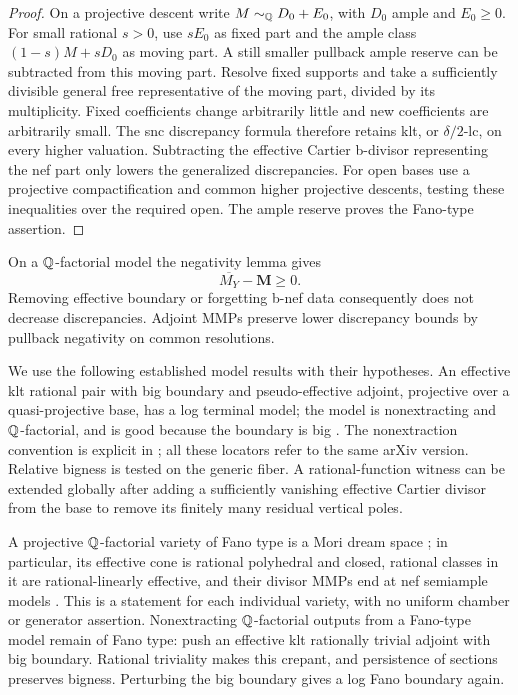 \begin{proof}
On a projective descent write \(M\sim_\mathbb Q D_0+E_0\), with \(D_0\)
ample and \(E_0\ge0\). For small rational \(s>0\), use \(sE_0\) as
fixed part and the ample class \((1-s)M+sD_0\) as moving part.
A still smaller pullback ample reserve can be subtracted from this
moving part. Resolve fixed supports and take a sufficiently divisible
general free representative of the moving part, divided by its
multiplicity. Fixed coefficients change arbitrarily little and new
coefficients are arbitrarily small. The snc discrepancy formula
therefore retains klt, or \(\delta/2\)-lc, on every higher valuation.
Subtracting the effective Cartier b-divisor representing the nef part
only lowers the generalized discrepancies. For open bases use a
projective compactification and common higher projective descents,
testing these inequalities over the required open. The ample reserve
proves the Fano-type assertion.
\end{proof}

On a \(\mathbb Q\)-factorial model the negativity lemma
\cite[Lemma~4.16]{FujinoFundamental} gives
\[
                         \overline{M_Y}-\mathbf M\ge0.
\]
Removing effective boundary or forgetting b-nef data consequently
does not decrease discrepancies. Adjoint MMPs preserve lower
discrepancy bounds by pullback negativity on common resolutions.

We use the following established model results with their hypotheses.
An effective klt rational pair with big boundary and pseudo-effective
adjoint, projective over a quasi-projective base, has a log terminal
model; the model is nonextracting and \(\mathbb Q\)-factorial, and is good
because the boundary is big
\cite[Theorem 1.2 and Lemma 3.9.3]{BCHM}.
The nonextraction convention is explicit in
\cite[Definition~3.6.6]{BCHM}; all these locators refer to the same
arXiv version.
Relative bigness is tested on the generic fiber. A rational-function
witness can be extended globally after adding a sufficiently vanishing
effective Cartier divisor from the base to remove its finitely many
residual vertical poles.

A projective \(\mathbb Q\)-factorial variety of Fano type is a Mori dream
space \cite[Corollary 1.3.1]{BCHM}; in particular, its effective cone
is rational polyhedral and closed, rational classes in it are
rational-linearly effective, and their divisor MMPs end at nef
semiample models \cite[Definition 1.10 and Proposition 1.11]{HuKeel}.
This is a statement for each individual variety, with no uniform
chamber or generator assertion. Nonextracting \(\mathbb Q\)-factorial
outputs from a Fano-type model remain of Fano type: push an effective
klt rationally trivial adjoint with big boundary. Rational triviality
makes this crepant, and persistence of sections preserves bigness.
Perturbing the big boundary gives a log Fano boundary again.

